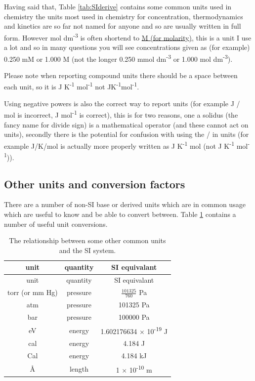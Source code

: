 \documentclass[
]{book}
\begin{document}
Having said that, Table \ref{tab:SIderive} contains some common units used in chemistry the units most used in chemistry for concentration, thermodynamics and kinetics are so far not named for anyone and so are usually written in full form. However mol dm\textsuperscript{-3} is often shortend to \href{https://goldbook.iupac.org/terms/view/A00295}{M (for molarity)}, this is a unit I use a lot and so in many questions you will see concentrations given as (for example) 0.250 mM or 1.000 M (not the longer 0.250 mmol dm\textsuperscript{-3} or 1.000 mol dm\textsuperscript{-3}).

Please note when reporting compound units there should be a space between each unit, so it is J K\textsuperscript{-1} mol\textsuperscript{-1} not JK\textsuperscript{-1}mol\textsuperscript{-1}.

Using negative powers is also the correct way to report units (for example J / mol is incorrect, J mol\textsuperscript{-1} is correct), this is for two reasons, one a solidus (the fancy name for divide sign) is a mathematical operator (and these cannot act on units), secondly there is the potential for confusion with using the / in units (for example J/K/mol is actually more properly written as J K\textsuperscript{-1} mol (not J K\textsuperscript{-1} mol\textsuperscript{-1})).

\hypertarget{other-units-and-conversion-factors}{%
\subsection{Other units and conversion factors}\label{other-units-and-conversion-factors}}

There are a number of non-SI base or derived units which are in common usage which are useful to know and be able to convert between. Table \ref{tab:nonSI} contains a number of useful unit conversions.

\begin{longtable}[]{@{}ccc@{}}
\caption{\label{tab:nonSI} The relationship between some other common units and the SI system.}\tabularnewline
\toprule
unit & quantity & SI equivalant\tabularnewline
\midrule
\endfirsthead
\toprule
unit & quantity & SI equivalant\tabularnewline
\midrule
\endhead
torr (or mm Hg) & pressure & \(\frac{101325}{760}\) Pa\tabularnewline
atm & pressure & 101325 Pa\tabularnewline
bar & pressure & 100000 Pa\tabularnewline
eV & energy & 1.602176634 × 10\textsuperscript{-19} J\tabularnewline
cal & energy & 4.184 J\tabularnewline
Cal & energy & 4.184 kJ\tabularnewline
Å & length & 1 × 10\textsuperscript{-10} m\tabularnewline
\bottomrule
\end{longtable}
\end{document}
